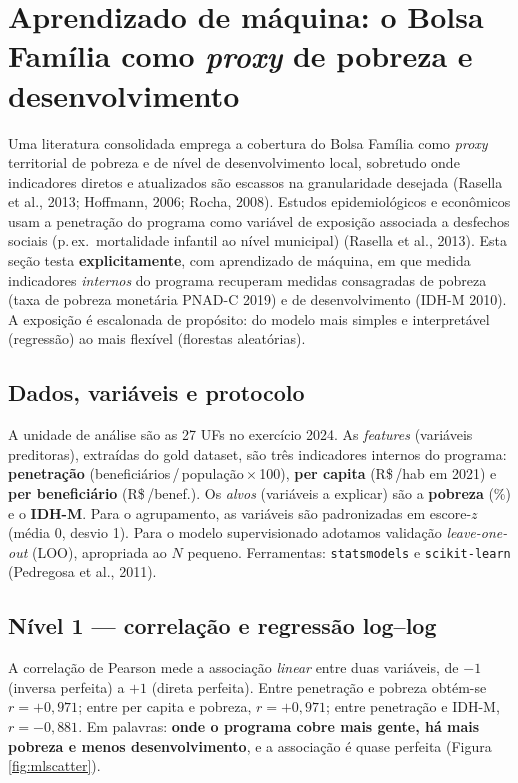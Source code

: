 \documentclass[12pt,a4paper,oneside]{article}
\newcommand{\rs}{R\$\,}
\begin{document}
\section{Aprendizado de máquina: o Bolsa Família como \textit{proxy} de pobreza e desenvolvimento}\label{sec:ml}

Uma literatura consolidada emprega a cobertura do Bolsa Família como
\textit{proxy} territorial de pobreza e de nível de desenvolvimento
local, sobretudo onde indicadores diretos e atualizados são escassos na
granularidade desejada (Rasella et al., 2013; Hoffmann, 2006; Rocha, 2008). Estudos epidemiológicos e econômicos usam a penetração
do programa como variável de exposição associada a desfechos sociais
(p.\,ex.\ mortalidade infantil ao nível municipal) (Rasella et al., 2013).
Esta seção testa \textbf{explicitamente}, com aprendizado de máquina, em
que medida indicadores \textit{internos} do programa recuperam medidas
consagradas de pobreza (taxa de pobreza monetária PNAD-C 2019) e de
desenvolvimento (IDH-M 2010). A exposição é escalonada de propósito: do
modelo mais simples e interpretável (regressão) ao mais flexível
(florestas aleatórias).

\subsection{Dados, variáveis e protocolo}

A unidade de análise são as 27 UFs no exercício 2024. As
\textit{features} (variáveis preditoras), extraídas do gold dataset, são
três indicadores internos do programa: \textbf{penetração}
(beneficiários\,/\,população\,$\times$\,100), \textbf{per capita}
(\rs/hab em 2021) e \textbf{per beneficiário} (\rs/benef.). Os
\textit{alvos} (variáveis a explicar) são a \textbf{pobreza} (\%) e o
\textbf{IDH-M}. Para o agrupamento, as variáveis são padronizadas em
escore-$z$ (média 0, desvio 1). Para o modelo supervisionado adotamos
validação \textit{leave-one-out} (LOO), apropriada ao $N$ pequeno.
Ferramentas: \texttt{statsmodels} e \texttt{scikit-learn} (Pedregosa et al., 2011).

\subsection{Nível 1 --- correlação e regressão log--log}

A correlação de Pearson mede a associação \textit{linear} entre duas
variáveis, de $-1$ (inversa perfeita) a $+1$ (direta perfeita). Entre
penetração e pobreza obtém-se $r = +0{,}971$; entre per capita e
pobreza, $r = +0{,}971$; entre penetração e IDH-M, $r = -0{,}881$. Em
palavras: \textbf{onde o programa cobre mais gente, há mais pobreza e
menos desenvolvimento}, e a associação é quase perfeita
(Figura \ref{fig:mlscatter}).
\end{document}
